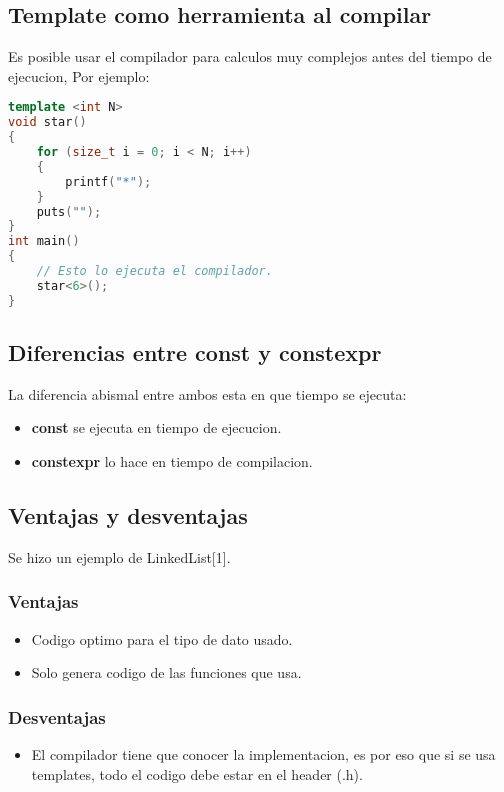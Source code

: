 \subsection{Template como herramienta al compilar}
Es posible usar el compilador para calculos muy complejos antes del tiempo de ejecucion,
Por ejemplo:
\begin{lstlisting}[language=C++, caption={'Calculos complejos'}]
template <int N>
void star()
{
    for (size_t i = 0; i < N; i++)
    {
        printf("*");
    }
    puts("");
}
int main()
{
    // Esto lo ejecuta el compilador.
    star<6>();
}
\end{lstlisting}


\subsection{Diferencias entre const y constexpr}
La diferencia abismal entre ambos esta en que tiempo se ejecuta:

\begin{itemize}
    \item \textbf{const} se ejecuta en tiempo de ejecucion.
    \item \textbf{constexpr} lo hace en tiempo de compilacion.
\end{itemize}

\subsection{Ventajas y desventajas}
Se hizo un ejemplo de LinkedList[1].
\subsubsection{Ventajas}
\begin{itemize}
    \item Codigo optimo para el tipo de dato usado.
    \item Solo genera codigo de las funciones que usa.
\end{itemize}
\subsubsection{Desventajas}
\begin{itemize}
    \item El compilador tiene que conocer la implementacion, es por eso que si se usa templates,
    todo el codigo debe estar en el header (.h).
\end{itemize}